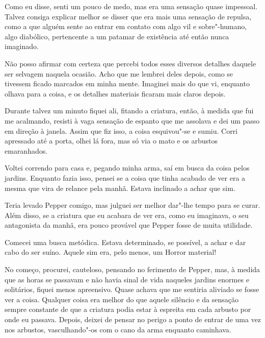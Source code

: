 Como eu disse, senti um pouco de medo, mas era uma sensação quase impessoal. Talvez consiga explicar melhor se
disser que era mais uma sensação de repulsa, como a que alguém sente ao entrar em contato com algo vil e sobre"-humano,
algo diabólico, pertencente a um patamar de existência até então nunca imaginado.

Não posso afirmar com certeza que percebi todos esses diversos detalhes daquele ser selvagem naquela ocasião. Acho que
me lembrei deles depois, como se tivessem ficado marcados em minha mente. Imaginei mais do que vi, enquanto olhava para
a coisa, e os detalhes materiais ficaram mais claros depois.

Durante talvez um minuto fiquei ali, fitando a criatura, então, à medida que fui me acalmando, resisti à vaga
sensação de espanto que me assolava e dei um passo em direção à janela. Assim que fiz isso, a coisa esquivou"-se e
sumiu. Corri apressado até a porta, olhei lá fora, mas só via o mato e os arbustos emaranhados. 

Voltei correndo para casa e, pegando minha arma, saí em busca da coisa pelos jardins. Enquanto fazia isso, pensei se a
coisa que tinha acabado de ver era a mesma que vira de relance pela manhã. Estava inclinado a achar que sim.

Teria levado Pepper comigo, mas julguei ser melhor dar"-lhe tempo para se curar. Além disso, se a criatura que eu
acabara de ver era, como eu imaginava, o seu antagonista da manhã, era pouco provável que Pepper fosse de muita
utilidade.

Comecei uma busca metódica. Estava determinado, se possível, a achar e dar cabo do ser suíno. Aquele sim era, pelo
menos, um Horror material!

No começo, procurei, cauteloso, pensando no ferimento de Pepper, mas, à medida que as horas se passavam e não havia
sinal de vida naqueles jardins enormes e solitários, fiquei menos apreensivo. Quase achava que me sentiria aliviado se
fosse ver a coisa. Qualquer coisa era melhor do que aquele silêncio e da sensação sempre constante de que a criatura
podia estar à espreita em cada arbusto por onde eu passava. Depois, deixei de pensar no perigo a ponto de entrar de uma
vez nos arbustos, vasculhando"-os com o cano da arma enquanto caminhava.

